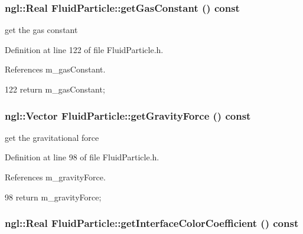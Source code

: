 \hypertarget{class_fluid_particle_ac9c1822921c77438883a033200243530}{
\subsubsection[{getGasConstant}]{\setlength{\rightskip}{0pt plus 5cm}ngl::Real FluidParticle::getGasConstant () const}}
\label{class_fluid_particle_ac9c1822921c77438883a033200243530}


get the gas constant 



Definition at line 122 of file FluidParticle.h.



References m\_\-gasConstant.




\begin{DoxyCode}
122 { return m_gasConstant; }
\end{DoxyCode}


\hypertarget{class_fluid_particle_aaf55f4024213da74d1e2ba1043b8bf5d}{
\subsubsection[{getGravityForce}]{\setlength{\rightskip}{0pt plus 5cm}ngl::Vector FluidParticle::getGravityForce () const}}
\label{class_fluid_particle_aaf55f4024213da74d1e2ba1043b8bf5d}


get the gravitational force 



Definition at line 98 of file FluidParticle.h.



References m\_\-gravityForce.




\begin{DoxyCode}
98 { return m_gravityForce; }
\end{DoxyCode}


\hypertarget{class_fluid_particle_ab5fe54946c3926616b694fc8aee28fc8}{
\subsubsection[{getInterfaceColorCoefficient}]{\setlength{\rightskip}{0pt plus 5cm}ngl::Real FluidParticle::getInterfaceColorCoefficient () const}}
\label{class_fluid_particle_ab5fe54946c3926616b694fc8aee28fc8}


